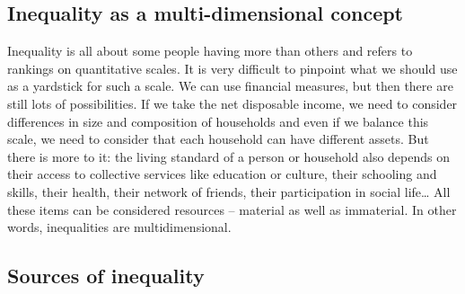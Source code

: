 \documentclass[../summary.tex]{subfiles}
\begin{document}
	\subsection{Inequality as a multi-dimensional concept}
	
	Inequality is all about some people having more than others and refers to rankings on quantitative scales. It is very difficult to pinpoint what we should use as a yardstick for such a scale. We can use financial measures, but then there are still lots of possibilities. If we take the net disposable income, we need to consider differences in size and composition of households and even if we balance this scale, we need to consider that each household can have different assets. But there is more to it: the living standard of a person or household also depends on their access to collective services like education or culture, their schooling and skills, their health, their network of friends, their participation in social life… All these items can be considered resources – material as well as immaterial. In other words, inequalities are multidimensional.  
	
	\subsection{Sources of inequality}
	
\end{document}
